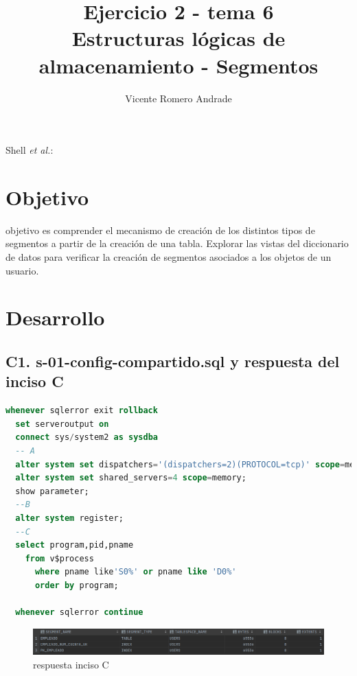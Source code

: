 \documentclass[journal]{IEEEtran}
\begin{document}
\title{Ejercicio 2 - tema 6 \\ Estructuras lógicas de almacenamiento - Segmentos}
%
\author{Vicente Romero Andrade}

%
{Shell \MakeLowercase{\textit{et al.}}: }

\maketitle


\IEEEpeerreviewmaketitle

\section{Objetivo}

 objetivo es comprender el mecanismo de creación de los distintos 
tipos de segmentos a partir de la creación de una tabla. Explorar las vistas del diccionario
de datos para verificar la creación de segmentos asociados a los objetos de un usuario.

\section{Desarrollo}
\subsection{C1. s-01-config-compartido.sql y respuesta del inciso C}
\begin{lstlisting}[language=sql, caption=s-01-config-compartido.sql,label={lst:codigo1}]
  whenever sqlerror exit rollback
  set serveroutput on
  connect sys/system2 as sysdba
  -- A
  alter system set dispatchers='(dispatchers=2)(PROTOCOL=tcp)' scope=memory;
  alter system set shared_servers=4 scope=memory;
  show parameter;
  --B
  alter system register;
  --C
  select program,pid,pname 
    from v$process 
      where pname like'S0%' or pname like 'D0%' 
      order by program;
      
  whenever sqlerror continue  
\end{lstlisting}
\begin{figure}[H]
  \centering
  \includegraphics[scale=.22]{captura_1.png}
   \caption{respuesta inciso C}
   \label{fig:validador_1}
\end{figure}
\end{document}
